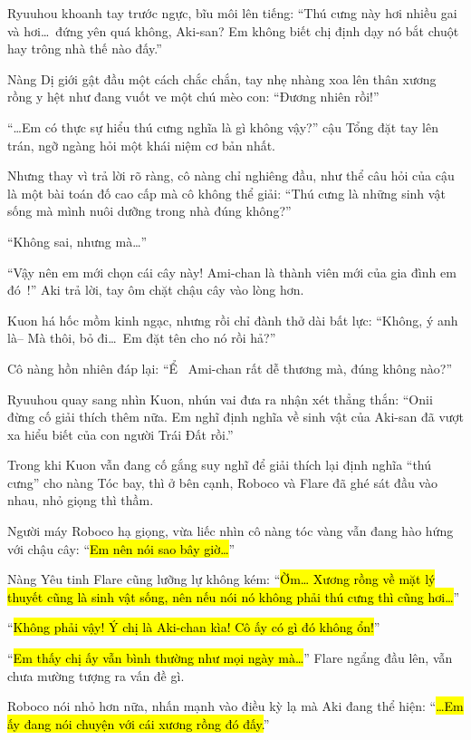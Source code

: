 \documentclass[../main.tex]{subfiles}
\begin{document}
Ryuuhou khoanh tay trước ngực, bĩu môi lên tiếng: ``Thú cưng này hơi nhiều gai và hơi\dots\ đứng yên quá không, Aki-san? Em không biết chị định dạy nó bắt chuột hay trông nhà thế nào đấy.''

Nàng Dị giới gật đầu một cách chắc chắn, tay nhẹ nhàng xoa lên thân xương rồng y hệt như đang vuốt ve một chú mèo con: ``Đương nhiên rồi!''

``\dots Em có thực sự hiểu thú cưng nghĩa là gì không vậy?'' cậu Tổng đặt tay lên trán, ngỡ ngàng hỏi một khái niệm cơ bản nhất.

Nhưng thay vì trả lời rõ ràng, cô nàng chỉ nghiêng đầu, như thể câu hỏi của cậu là một bài toán đố cao cấp mà cô không thể giải: ``Thú cưng là những sinh vật sống mà mình nuôi dưỡng trong nhà đúng không?''

``Không sai, nhưng mà\dots''

``Vậy nên em mới chọn cái cây này! Ami-chan là thành viên mới của gia đình em đó~{}!'' Aki trả lời, tay ôm chặt chậu cây vào lòng hơn.

Kuon há hốc mồm kinh ngạc, nhưng rồi chỉ đành thở dài bất lực: ``Không, ý anh là-- Mà thôi, bỏ đi\dots\ Em đặt tên cho nó rồi hả?''

Cô nàng hồn nhiên đáp lại: ``Ể~{} Ami-chan rất dễ thương mà, đúng không nào?''

Ryuuhou quay sang nhìn Kuon, nhún vai đưa ra nhận xét thẳng thắn: ``Onii đừng cố giải thích thêm nữa. Em nghĩ định nghĩa về sinh vật của Aki-san đã vượt xa hiểu biết của con người Trái Đất rồi.''

Trong khi Kuon vẫn đang cố gắng suy nghĩ để giải thích lại định nghĩa ``thú cưng'' cho nàng Tóc bay, thì ở bên cạnh, Roboco và Flare đã ghé sát đầu vào nhau, nhỏ giọng thì thầm.

Người máy Roboco hạ giọng, vừa liếc nhìn cô nàng tóc vàng vẫn đang hào hứng với chậu cây: ``\hl{Em nên nói sao bây giờ\dots}''

Nàng Yêu tinh Flare cũng lưỡng lự không kém: ``\hl{Ờm\dots{} Xương rồng về mặt lý thuyết cũng là sinh vật sống, nên nếu nói nó không phải thú cưng thì cũng hơi\dots}''

``\hl{Không phải vậy! Ý chị là Aki-chan kìa! Cô ấy có gì đó không ổn!}''

``\hl{Em thấy chị ấy vẫn bình thường như mọi ngày mà\dots}'' Flare ngẩng đầu lên, vẫn chưa mường tượng ra vấn đề gì.

Roboco nói nhỏ hơn nữa, nhấn mạnh vào điều kỳ lạ mà Aki đang thể hiện: ``\hl{\dots Em ấy đang nói chuyện với cái xương rồng đó đấy.}''
\end{document}
